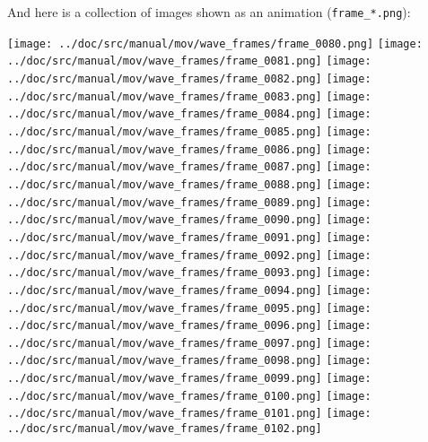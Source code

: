 \documentclass[%
oneside,                 %
final,                   %
10pt]{article}
\newenvironment{doconce:movie}{}{}
\newcounter{doconce:movie:counter}
\begin{document}
And here is a collection of images shown as an animation
(\Verb!frame_*.png!):
\begin{doconce:movie}
\begin{center}
\begin{animateinline}{1} %
\texttt{[image: ../doc/src/manual/mov/wave\_frames/frame\_0080.png]}
\newframe
\texttt{[image: ../doc/src/manual/mov/wave\_frames/frame\_0081.png]}
\newframe
\texttt{[image: ../doc/src/manual/mov/wave\_frames/frame\_0082.png]}
\newframe
\texttt{[image: ../doc/src/manual/mov/wave\_frames/frame\_0083.png]}
\newframe
\texttt{[image: ../doc/src/manual/mov/wave\_frames/frame\_0084.png]}
\newframe
\texttt{[image: ../doc/src/manual/mov/wave\_frames/frame\_0085.png]}
\newframe
\texttt{[image: ../doc/src/manual/mov/wave\_frames/frame\_0086.png]}
\newframe
\texttt{[image: ../doc/src/manual/mov/wave\_frames/frame\_0087.png]}
\newframe
\texttt{[image: ../doc/src/manual/mov/wave\_frames/frame\_0088.png]}
\newframe
\texttt{[image: ../doc/src/manual/mov/wave\_frames/frame\_0089.png]}
\newframe
\texttt{[image: ../doc/src/manual/mov/wave\_frames/frame\_0090.png]}
\newframe
\texttt{[image: ../doc/src/manual/mov/wave\_frames/frame\_0091.png]}
\newframe
\texttt{[image: ../doc/src/manual/mov/wave\_frames/frame\_0092.png]}
\newframe
\texttt{[image: ../doc/src/manual/mov/wave\_frames/frame\_0093.png]}
\newframe
\texttt{[image: ../doc/src/manual/mov/wave\_frames/frame\_0094.png]}
\newframe
\texttt{[image: ../doc/src/manual/mov/wave\_frames/frame\_0095.png]}
\newframe
\texttt{[image: ../doc/src/manual/mov/wave\_frames/frame\_0096.png]}
\newframe
\texttt{[image: ../doc/src/manual/mov/wave\_frames/frame\_0097.png]}
\newframe
\texttt{[image: ../doc/src/manual/mov/wave\_frames/frame\_0098.png]}
\newframe
\texttt{[image: ../doc/src/manual/mov/wave\_frames/frame\_0099.png]}
\newframe
\texttt{[image: ../doc/src/manual/mov/wave\_frames/frame\_0100.png]}
\newframe
\texttt{[image: ../doc/src/manual/mov/wave\_frames/frame\_0101.png]}
\newframe
\texttt{[image: ../doc/src/manual/mov/wave\_frames/frame\_0102.png]}

\end{animateinline}
\end{center}
\end{doconce:movie}
\end{document}
